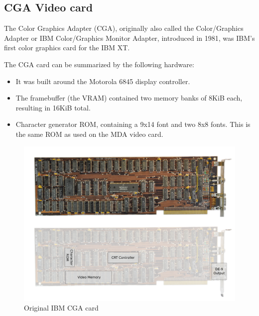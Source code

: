 \documentclass[book.tex]{subfiles}
\begin{document}
\subsection{CGA Video card}
The Color Graphics Adapter (CGA), originally also called the Color/Graphics Adapter or IBM Color/Graphics Monitor Adapter, introduced in 1981, was IBM's first color graphics card for the IBM XT.\\
\par
The CGA card can be summarized by the following hardware:
\begin{itemize}
  \item It was built around the Motorola 6845 display controller.
  \item The framebuffer (the VRAM) contained two memory banks of 8KiB each, resulting in 16KiB total.
  \item Character generator ROM, containing a 9x14 font and two 8x8 fonts. This is the same ROM as used on the MDA video card.
\end{itemize}

\begin{figure}[H]
  \centering 
  \includegraphics[width=1.3\textwidth, angle =90 ]{screenshots_300dpi/hardware/ibm_cga_card.png} 
  \caption{Original IBM CGA card}
  \label{fig:ibm_cga_card}
\end{figure}
\end{document}
